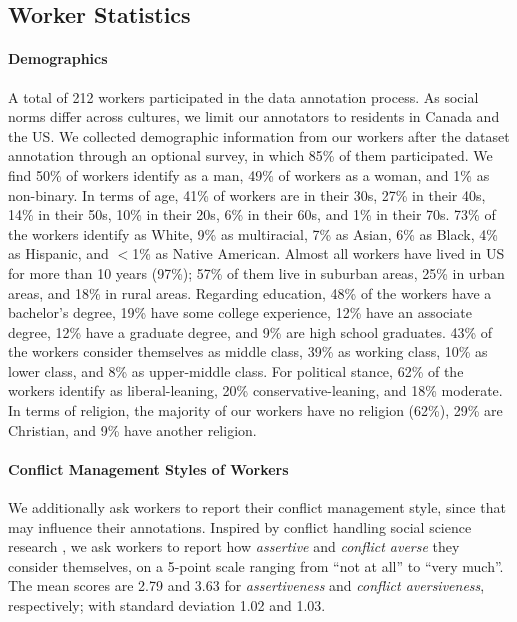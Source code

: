 \documentclass[11pt]{article}
\begin{document}
\subsection{Worker Statistics}
\label{app:workers}

\paragraph{Demographics}

A total of 212 workers participated in the data annotation process.
As social norms differ across cultures, we limit our annotators to residents in Canada and the US.
We collected demographic information from our workers after the dataset annotation through an optional survey, in which 85\% of them participated.
We find 50\% of workers identify as a man, 49\% of workers as a woman, and 1\% as non-binary.
In terms of age, 41\% of workers are in their 30s, 27\% in their 40s, 14\% in their 50s, 10\% in their 20s, 6\% in their 60s, and 1\% in their 70s.
73\% of the workers identify as White, 9\% as multiracial, 7\% as Asian, 6\% as Black, 4\% as Hispanic, and $<$1\% as Native American.
Almost all workers have lived in US for more than 10 years (97\%); 57\% of them live in suburban areas, 25\% in urban areas, and 18\% in rural areas.
Regarding education, 48\% of the workers have a bachelor's degree, 19\% have some college experience, 12\% have an associate degree, 12\% have a graduate degree, and 9\% are high school graduates.
43\% of the workers consider themselves as middle class, 39\% as working class, 10\% as lower class, and 8\% as upper-middle class.
For political stance, 62\% of the workers identify as liberal-leaning, 20\% conservative-leaning, and 18\% moderate.
In terms of religion, the majority of our workers have no religion (62\%), 29\% are Christian, and 9\% have another religion.

\paragraph{Conflict Management Styles of Workers}

We additionally ask workers to report their conflict management style, since that may influence their annotations.
Inspired by conflict handling social science research \cite{dechurch2001maximizing,rahim2002toward}, we ask workers to report how \textit{assertive} and \textit{conflict averse} they consider themselves, on a 5-point scale ranging from ``not at all'' to ``very much''.
The mean scores are 2.79 and 3.63 for \textit{assertiveness} and \textit{conflict aversiveness}, respectively; with standard deviation 1.02 and 1.03.
\end{document}

